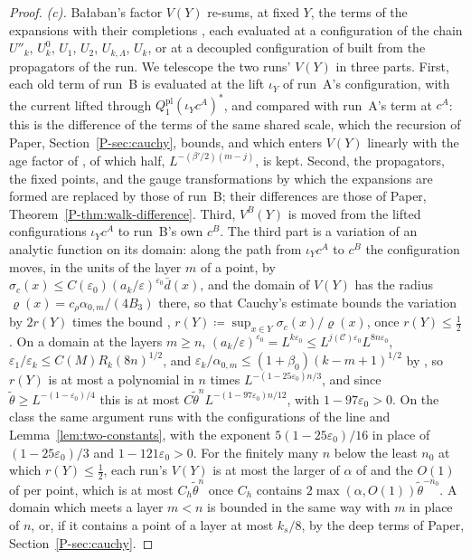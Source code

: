 \documentclass[11pt]{preprint}
\numberwithin{equation}{section}
\theoremstyle{definition}
\theoremstyle{remark}
\theoremstyle{plain}
\begin{document}
\begin{proof}
\emph{(c).} Ba{\l}aban's factor $V(Y)$ re-sums, at fixed $Y$, the terms of the expansions \cite[(1.59)--(1.64), pp.~372--374]{BalabanLFR2} with their completions \cite[p.~377, ll.~22--26]{BalabanLFR2}, each evaluated at a configuration of the chain $U''_k$, $U^0_k$, $U_1$, $U_2$, $U_{k,\Lambda}$, $U_k$, or at a decoupled configuration of \cite[(1.60)]{BalabanLFR2} built from the propagators of the run. We telescope the two runs' $V(Y)$ in three parts. First, each old term of run~B is evaluated at the lift $\iota_Y$ of run~A's configuration, with the current lifted through $Q^{\mathrm{pl}}_1(\iota_Yc^A)^*$, and compared with run~A's term at $c^A$: this is the difference of the terms of the same shared scale, which the recursion of Paper, Section~\ref{P-sec:cauchy}, bounds, and which enters $V(Y)$ linearly with the age factor of \cite[(2.43), p.~263]{BalabanCRE}, of which half, $L^{-(\beta'/2)(m-j)}$, is kept. Second, the propagators, the fixed points, and the gauge transformations by which the expansions are formed are replaced by those of run~B; their differences are those of Paper, Theorem~\ref{P-thm:walk-difference}. Third, $V^B(Y)$ is moved from the lifted configurations $\iota_Yc^A$ to run~B's own $c^B$. The third part is a variation of an analytic function on its domain: along the path from $\iota_Yc^A$ to $c^B$ the configuration moves, in the units of the layer $m$ of a point, by $\sigma_c(x) \leq C(\varepsilon_0)(a_k/\varepsilon)^{\varepsilon_0}\bar d(x)$, and the domain of $V(Y)$ has the radius $\varrho(x) = c_\rho\alpha_{0,m}/(4B_3)$ there, so that Cauchy's estimate bounds the variation by $2r(Y)$ times the bound \cite[(1.68)]{BalabanLFR2}, $r(Y) \coloneqq \sup_{x \in Y}\sigma_c(x)/\varrho(x)$, once $r(Y) \leq \frac12$. On a domain at the layers $m \geq n$, $(a_k/\varepsilon)^{\varepsilon_0} = L^{k\varepsilon_0} \leq L^{j(\mathcal C)\varepsilon_0}L^{8n\varepsilon_0}$, $\varepsilon_1/\varepsilon_k \leq C(M)R_k(8n)^{1/2}$, and $\varepsilon_k/\alpha_{0,m} \leq (1 + \beta_0)(k - m + 1)^{1/2}$ by \cite[(2.6), (2.28)]{BalabanCRE}, so $r(Y)$ is at most a polynomial in $n$ times $L^{-(1-25\varepsilon_0)n/3}$, and since $\tilde\theta \geq L^{-(1-\varepsilon_0)/4}$ this is at most $C\tilde\theta^nL^{-(1-97\varepsilon_0)n/12}$, with $1 - 97\varepsilon_0 > 0$. On the class the same argument runs with the configurations of the line and Lemma~\ref{lem:two-constants}, with the exponent $5(1 - 25\varepsilon_0)/16$ in place of $(1 - 25\varepsilon_0)/3$ and $1 - 121\varepsilon_0 > 0$. For the finitely many $n$ below the least $n_0$ at which $r(Y) \leq \frac12$, each run's $V(Y)$ is at most the larger of $\alpha$ of \cite[(1.68)]{BalabanLFR2} and the $O(1)$ of \cite[(1.69)]{BalabanLFR2} per point, which is at most $C_h\tilde\theta^n$ once $C_h$ contains $2\max(\alpha, O(1))\tilde\theta^{-n_0}$. A domain which meets a layer $m < n$ is bounded in the same way with $m$ in place of $n$, or, if it contains a point of a layer at most $k_s/8$, by the deep terms of Paper, Section~\ref{P-sec:cauchy}.


\end{proof}
\end{document}
